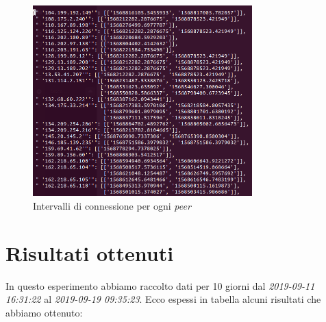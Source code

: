 \begin{figure}[htb]
\begin{center}
   \includegraphics[width=0.755\textwidth]{imgs/intervalli.png}
   \caption{Intervalli di connessione per ogni \textit{peer}}
   \end{center}
   \hfill
\end{figure}




\section{Risultati ottenuti} 
In questo esperimento abbiamo raccolto dati per 10 giorni dal \textit{ 2019-09-11 16:31:22} al \textit{2019-09-19 09:35:23}. Ecco espessi in tabella alcuni risultati che abbiamo ottenuto:

\begin{table}[h!]
    \label{tab:table1}
\end{table}


